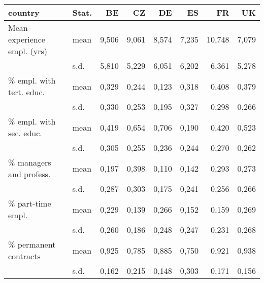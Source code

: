 \begin{tabular}{llrrrrrr}
\toprule
country                     & Stat. & BE    & CZ    & DE    & ES    & FR     & UK    \\
\midrule
Mean experience empl. (yrs) & mean & 9,506 & 9,061 & 8,574 & 7,235 & 10,748 & 7,079 \\
                            & s.d. & 5,810 & 5,229 & 6,051 & 6,202 & 6,361  & 5,278 \\
\% empl. with tert. educ.   & mean & 0,329 & 0,244 & 0,123 & 0,318 & 0,408  & 0,379 \\
                            & s.d. & 0,330 & 0,253 & 0,195 & 0,327 & 0,298  & 0,266 \\
\% empl. with sec. educ.    & mean & 0,419 & 0,654 & 0,706 & 0,190 & 0,420  & 0,523 \\
                            & s.d. & 0,305 & 0,255 & 0,236 & 0,244 & 0,270  & 0,262 \\
\% managers and profess.    & mean & 0,197 & 0,398 & 0,110 & 0,142 & 0,293  & 0,273 \\
                            & s.d. & 0,287 & 0,303 & 0,175 & 0,241 & 0,256  & 0,266 \\
\% part-time empl.          & mean & 0,229 & 0,139 & 0,266 & 0,152 & 0,159  & 0,269 \\
                            & s.d. & 0,260 & 0,186 & 0,248 & 0,247 & 0,231  & 0,268 \\
\% permanent contracts      & mean & 0,925 & 0,785 & 0,885 & 0,750 & 0,921  & 0,938 \\
                            & s.d. & 0,162 & 0,215 & 0,148 & 0,303 & 0,171  & 0,156 \\
\bottomrule                            
\end{tabular}

